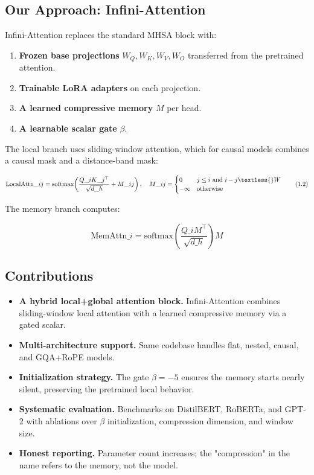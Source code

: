 \subsection{Our Approach: Infini-Attention}

Infini-Attention replaces the standard MHSA block with:

\begin{enumerate}
\item \textbf{Frozen base projections} $W_Q, W_K, W_V, W_O$ transferred from the
  pretrained attention.
\item \textbf{Trainable LoRA adapters} on each projection.
\item \textbf{A learned compressive memory} $M$ per head.
\item \textbf{A learnable scalar gate} $\beta$.

\end{enumerate}
The local branch uses sliding-window attention, which for causal models 
combines a causal mask and a distance-band mask:

\[
\text{LocalAttn}\_{ij} = \text{softmax}\!\left(\frac{Q\_i K\_j^\top}{\sqrt{d\_h}} + M\_{ij}\right), \quad
M\_{ij} = \begin{cases} 0 & j \leq i \text{ and } i - j \textless{} W \\ -\infty & \text{otherwise} \end{cases}
\tag{1.2}
\]

The memory branch computes:

\[
\text{MemAttn}\_i = \text{softmax}\!\left(\frac{Q\_i M^\top}{\sqrt{d\_h}}\right) M
\tag{1.3}
\]

\subsection{Contributions}

\begin{itemize}
\item \textbf{A hybrid local+global attention block.} Infini-Attention combines
  sliding-window local attention with a learned compressive memory via a
  gated scalar.
\item \textbf{Multi-architecture support.} Same codebase handles flat, nested,
  causal, and GQA+RoPE models.
\item \textbf{Initialization strategy.} The gate $\beta = -5$ ensures the memory
  starts nearly silent, preserving the pretrained local behavior.
\item \textbf{Systematic evaluation.} Benchmarks on DistilBERT, RoBERTa, and GPT-2
  with ablations over $\beta$ initialization, compression dimension, and
  window size.
\item \textbf{Honest reporting.} Parameter count increases; the "compression" in the
  name refers to the memory, not the model.

\end{itemize}
